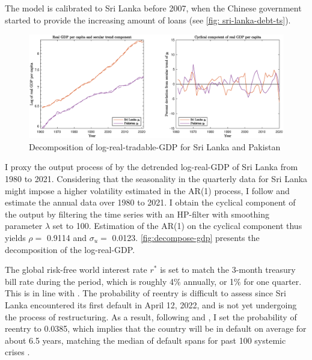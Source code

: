 The model is calibrated to Sri Lanka before 2007, when the Chinese government started to provide the increasing amount of loans (see \autoref{fig: sri-lanka-debt-ts}).
\begin{figure}[t]
    \includegraphics[width = \textwidth]{fig/decompose_gdp.eps}
    \caption{Decomposition of log-real-tradable-GDP for Sri Lanka and Pakistan}
    \label{fig:decompose-gdp}
\end{figure}

I proxy the output process of  by the detrended log-real-GDP of Sri Lanka from 1980 to 2021. Considering that the seasonality in the quarterly data for Sri Lanka might impose a higher volatility estimated in the AR(1) process, I follow \citet{Hinrichsen_2020-chapter4} and estimate the annual data over 1980 to 2021. I obtain the cyclical component of the output by filtering the time series with an HP-filter with smoothing parameter $\lambda$ set to 100.
Estimation of the AR(1) on the cyclical component thus yields $\rho = $ 0.9114 and $\sigma_u = $ 0.0123\footnotemark{}. \autoref{fig:decompose-gdp} presents the decomposition of the log-real-GDP.

The global risk-free world interest rate $r^*$ is set to match the 3-month treasury bill rate during the period, which is roughly 4\% annually, or 1\% for one quarter. This is in line with \citet{Chatterjee-12}.
The probability of reentry is difficult to assess since Sri Lanka encountered its first default in April 12, 2022, and is not yet undergoing the process of restructuring. As a result, following \citet*{Chatterjee-12} and \citet*{Hinrichsen_2020-chapter4}, I set the probability of reentry to 0.0385, which implies that the country will be in default on average for about 6.5 years, matching the median of default spans for past 100 systemic crises \citep*{Reinhart-Rogoff-2014-100-episode}.

